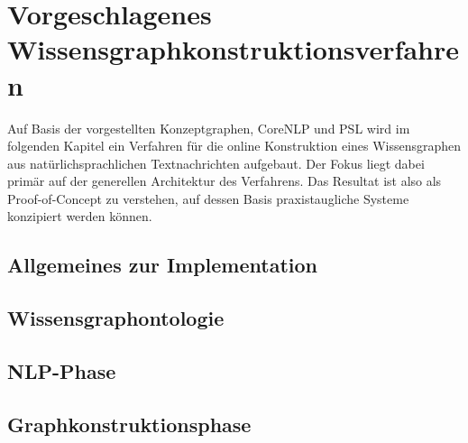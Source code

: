 %
\chapter{Vorgeschlagenes Wissensgraph\-konstruktions\-verfahren}
\label{sec:text2kg}

Auf Basis der vorgestellten Konzeptgraphen, CoreNLP und PSL wird im folgenden Kapitel ein Verfahren für die online Konstruktion eines Wissensgraphen aus natürlichsprachlichen Textnachrichten aufgebaut.
Der Fokus liegt dabei primär auf der generellen Architektur des Verfahrens.
Das Resultat ist also als Proof-of-Concept zu verstehen, auf dessen Basis praxistaugliche Systeme konzipiert werden können.

\section{Allgemeines zur Implementation}
\label{sec:text2kg:implementation}

\section{Wissensgraphontologie}
\label{sec:text2kg:ontology}

\section{NLP-Phase}
\label{sec:text2kg:nlp}

\section{Graphkonstruktionsphase}
\label{sec:text2kg:psl}
